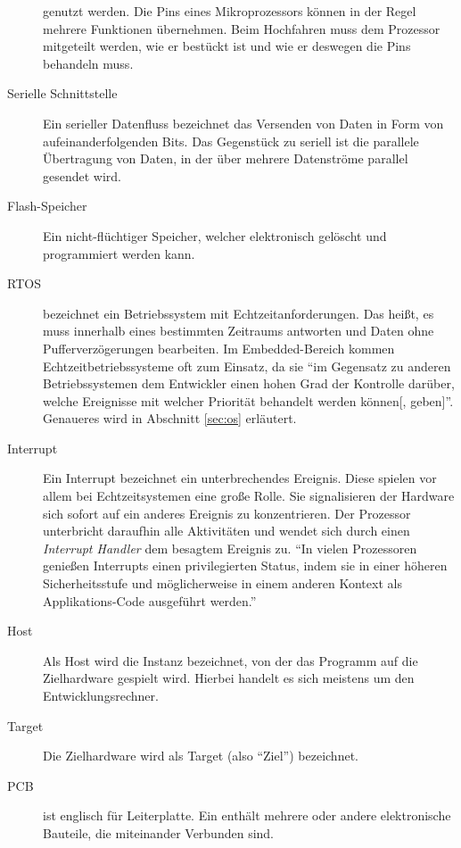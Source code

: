 \begin{description}
	        genutzt werden. Die Pins eines Mikroprozessors können in der Regel mehrere Funktionen übernehmen. Beim
	        Hochfahren muss dem Prozessor mitgeteilt werden, wie er bestückt ist und wie er deswegen die Pins
	        behandeln muss\citep[vgl.~Kap.~1.3]{Asche2017}.
	        \item[Serielle Schnittstelle] Ein serieller Datenfluss bezeichnet das Versenden von Daten in Form von
	        aufeinanderfolgenden Bits. Das Gegenstück zu seriell ist die parallele Übertragung von Daten, in der über
	        mehrere Datenströme parallel gesendet wird.
	        \item[Flash-Speicher] Ein nicht-flüchtiger Speicher, welcher elektronisch gelöscht und programmiert werden
	        kann.
	        \item[RTOS]  bezeichnet ein Betriebssystem mit
	        Echtzeitanforderungen. Das heißt, es muss innerhalb eines bestimmten Zeitraums antworten und Daten ohne
	        Pufferverzögerungen bearbeiten.
	        Im Embedded\hyp{}Bereich kommen Echtzeitbetriebssysteme oft zum Einsatz, da sie ``im Gegensatz zu anderen
	        Betriebssystemen dem Entwickler einen hohen Grad der Kontrolle darüber, welche Ereignisse mit welcher
	        Priorität behandelt werden können[, geben]''\citep[Kap.~3.1]{Asche2017}.
	        Genaueres wird in Abschnitt \ref{sec:os} erläutert.
	        \item[Interrupt] Ein Interrupt bezeichnet ein unterbrechendes Ereignis.
	        Diese spielen vor allem bei Echtzeitsystemen eine große Rolle. Sie signalisieren der Hardware sich sofort
	        auf ein anderes Ereignis zu konzentrieren. Der Prozessor unterbricht daraufhin alle Aktivitäten und
	        wendet sich durch einen \textit{Interrupt Handler} dem besagtem Ereignis zu.
	        ``In vielen Prozessoren genießen Interrupts einen privilegierten Status, indem sie in einer
              höheren Sicherheitsstufe und möglicherweise in einem anderen Kontext als Applikations-Code ausgeführt
              werden.''\citep[Kap.~1.5]{Asche2017}
	        \item[Host] Als Host wird die Instanz bezeichnet, von der das Programm auf die Zielhardware gespielt wird.
	        Hierbei handelt es sich meistens um den Entwicklungsrechner.
	        \item[Target] Die Zielhardware wird als Target (also ``Ziel'') bezeichnet.
	        \item[PCB]  ist englisch für Leiterplatte. Ein  enthält
	        mehrere  oder andere elektronische Bauteile, die miteinander Verbunden sind.
	    \end{description}
